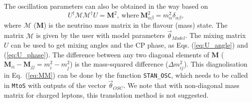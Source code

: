 \documentclass[aps,prd,nofootinbib,preprint]{revtex4}
\begin{document}
The oscillation parameters can also be obtained in the way based on
\begin{equation}\label{eq:MM}
U^\dagger\mathcal{M}\mathcal{M}^\dagger U = \mathbf{M}^2,~\text{where}~\mathbf{M}^2_{\alpha\beta}=m_\alpha^2\delta_{\alpha\beta},
\end{equation}
where $\mathcal{M}$ ($\mathbf{M}$) is the neutrino mass matrix in the flavour (mass) state. The matrix $\mathcal{M}$ is given by the user with model parameters $\vec{\theta}_{Model}$. The mixing matrix $U$ can be used to get mixing angles and the CP phase, as Eqs. (\ref{eq:U_angle}) and (\ref{eq:U_phase}). The difference between any two diagonal elements of $\textbf{M}$ ($\textbf{M}_{ii}-\textbf{M}_{jj}=m_i^2-m_j^2$) is the mass-squared difference ($\Delta m_{ij}^2$). This diagnolisation in Eq.~(\ref{eq:MM}) can be done by the function \texttt{STAN\_OSC}, which needs to be called in \texttt{MtoS} with outputs of the vector $\vec{\theta}_{OSC}$. {\color{blue}We note that with non-diagonal mass matrix for charged leptons, this translation method is not suggested.}
\end{document}
